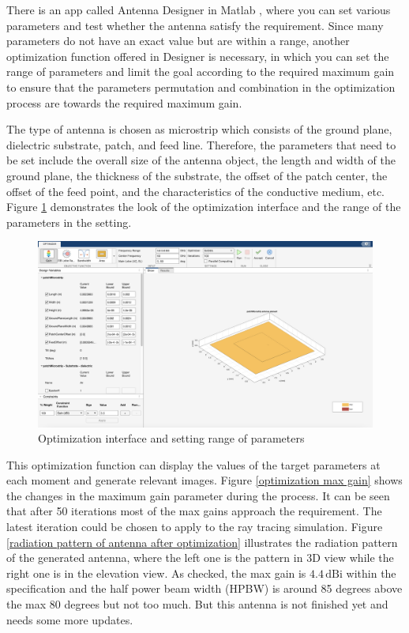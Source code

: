 \documentclass[12pt,DIV14,BCOR12mm,a4paper,footinclude=false,headinclude,parskip=half-,twoside,openright,cleardoublepage=empty,toc=index,bibliography=totoc,listof=totoc]{scrreprt}
\numberwithin{equation}{chapter}
\begin{document}
There is an app called Antenna Designer in Matlab \cite{antenna_designer_operation}, where you can set various parameters and test whether the antenna satisfy the requirement. Since many parameters do not have an exact value but are within a range, another optimization function offered in Designer \cite{optimization_operation} is necessary, in which you can set the range of parameters and limit the goal according to the required maximum gain to ensure that the parameters permutation and combination in the optimization process are towards the required maximum gain.

The type of antenna is chosen as microstrip which consists of the ground plane, dielectric substrate, patch, and feed line. Therefore, the parameters that need to be set include the overall size of the antenna object, the length and width of the ground plane, the thickness of the substrate, the offset of the patch center, the offset of the feed point, and the characteristics of the conductive medium, etc. Figure \ref{optimization interface} demonstrates the look of the optimization interface and the range of the parameters in the setting.

\begin{figure}[t]
	\centering
	\includegraphics[scale=.28]{figures/optimization_interface.png}
	\caption{Optimization interface and setting range of parameters}
	\label{optimization interface}
\end{figure}

This optimization function can display the values of the target parameters at each moment and generate relevant images. Figure \ref{optimization max gain} shows the changes in the maximum gain parameter during the process. It can be seen that after 50 iterations most of the max gains approach the requirement. The latest iteration could be chosen to apply to the ray tracing simulation. Figure \ref{radiation pattern of antenna after optimization} illustrates the radiation pattern of the generated antenna, where the left one is the pattern in 3D view while the right one is in the elevation view. As checked, the max gain is $4.4\,\mathrm{dBi}$ within the specification and the half power beam width (HPBW) is around 85 degrees above the max 80 degrees but not too much. But this antenna is not finished yet and needs some more updates.
\end{document}
